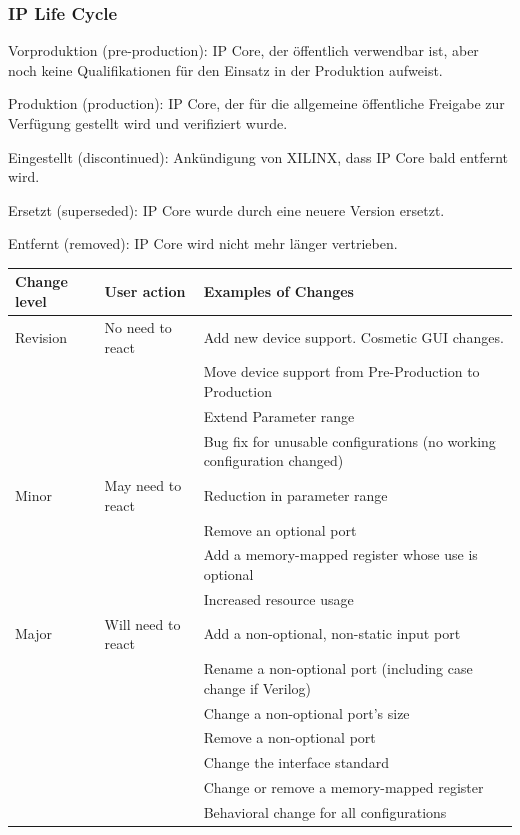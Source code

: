 \subsubsection{IP Life Cycle}
\begin{compactitem}
        \item Vorproduktion (pre-production): IP Core, der öffentlich verwendbar ist, aber noch keine Qualifikationen für den Einsatz in der Produktion aufweist.
        \item Produktion (production): IP Core, der für die allgemeine öffentliche Freigabe zur Verfügung gestellt wird und verifiziert wurde.
        \item Eingestellt (discontinued): Ankündigung von XILINX, dass IP Core bald entfernt wird.
        \item Ersetzt (superseded): IP Core wurde durch eine neuere Version ersetzt.
        \item Entfernt (removed): IP Core wird nicht mehr länger vertrieben.
\end{compactitem}
\begin{tabular}{| l | l | l |}
\hline
\textbf{Change level} & \textbf{User action} & Examples of Changes\\
\hline
Revision & No need to react & Add new device support. Cosmetic GUI changes.\\
 & & Move device support from Pre-Production to Production\\
 & & Extend Parameter range\\
 & & Bug fix for unusable configurations (no working configuration changed)\\
\hline
Minor & May need to react & Reduction in parameter range\\
 & & Remove an optional port\\
 & & Add a memory-mapped register whose use is optional\\
 & & Increased resource usage\\
\hline
Major & Will need to react & Add a non-optional, non-static input port\\
 & & Rename a non-optional port (including case change if Verilog)\\
 & & Change a non-optional port's size\\
 & & Remove a non-optional port\\
 & & Change the interface standard\\
 & & Change or remove a memory-mapped register\\
 & & Behavioral change for all configurations\\
\hline
\end{tabular}
